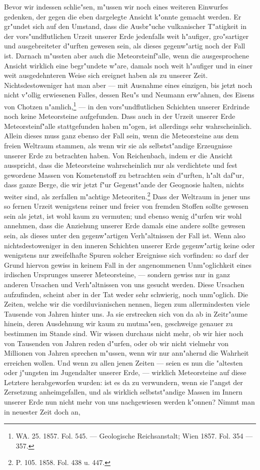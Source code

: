 \documentclass[a4paper, 8pt, oneside, polutonikogreek, german]{article}
\begin{document}
Bevor wir indessen schlie"sen, m"ussen wir noch eines weiteren Einwurfes gedenken, der gegen die eben dargelegte Ansicht k"onnte gemacht werden. Er gr"undet sich auf den Umstand, dass die Ausbr"uche vulkanischer T"atigkeit in der vors"undflutlichen Urzeit unserer Erde jedenfalls weit h"aufiger, gro"sartiger und ausgebreiteter d"urften gewesen sein, als dieses gegenw"artig noch der Fall ist. Darnach m"ussten aber auch die Meteorsteinf"alle, wenn die ausgesprochene Ansicht wirklich eine begr"undete w"are, damals noch weit h"aufiger und in einer weit ausgedehnteren Weise sich ereignet haben als zu unserer Zeit. Nichtsdestoweniger hat man aber --- mit Ausnahme eines einzigen, bis jetzt noch nicht v"ollig erwiesenen Falles, dessen Reu"s und Neumann erw"ahnen, des Eisens von Chotzen n"amlich,\footnote{WA. 25. 1857. Fol. 545. --- Geologische Reichsanstalt; Wien 1857. Fol. 354 --- 357.} --- in den vors"undflutlichen Schichten unserer Erdrinde noch keine Meteorsteine aufgefunden. Dass auch in der Urzeit unserer Erde Meteorsteinf"alle stattgefunden haben m"ogen, ist allerdings sehr wahrscheinlich. Allein dieses muss ganz ebenso der Fall sein, wenn die Meteorsteine aus dem freien Weltraum stammen, als wenn wir sie als selbstst"andige Erzeugnisse unserer Erde zu betrachten haben. Von Reichenbach, indem er die Ansicht ausspricht, dass die Meteorsteine wahrscheinlich nur als verdichtete und fest gewordene Massen von Kometenstoff zu betrachten sein d"urften, h"alt daf"ur, dass ganze Berge, die wir jetzt f"ur Gegenst"ande der Geognosie halten, nichts weiter sind, als zerfallen m"achtige Meteoriten.\footnote{P. 105. 1858. Fol. 438 u. 447.} Dass der Weltraum in jener uns so fernen Urzeit wenigstens reiner und freier von fremden Stoffen sollte gewesen sein als jetzt, ist wohl kaum zu vermuten; und ebenso wenig d"urfen wir wohl annehmen, dass die Anziehung unserer Erde damals eine andere sollte gewesen sein, als dieses unter den gegenw"artigen Verh"altnissen der Fall ist. Wenn also nichtsdestoweniger in den inneren Schichten unserer Erde gegenw"artig keine oder wenigstens nur zweifelhafte Spuren solcher Ereignisse sich vorfinden: so darf der Grund hiervon gewiss in keinem Fall in der angenommenen Unm"oglichkeit eines irdischen Ursprunges unserer Meteorsteine, --- sondern gewiss nur in ganz anderen Ursachen und Verh"altnissen von uns gesucht werden. Diese Ursachen aufzufinden, scheint aber in der Tat weder sehr schwierig, noch unm"oglich. Die Zeiten, welche wir die vordiluvianischen nennen, liegen zum allermindesten viele Tausende von Jahren hinter uns. Ja sie erstrecken sich von da ab in Zeitr"aume hinein, deren Ausdehnung wir kaum zu mutma"sen, geschweige genauer zu bestimmen im Stande sind. Wir wissen durchaus nicht mehr, ob wir hier noch von Tausenden von Jahren reden d"urfen, oder ob wir nicht vielmehr von Millionen von Jahren sprechen m"ussen, wenn wir nur ann"ahernd die Wahrheit erreichen wollen. Und wenn zu allen jenen Zeiten --- seien es nun die "altesten oder j"ungsten im Jugendalter unserer Erde, --- wirklich Meteorsteine auf diese Letztere herabgeworfen wurden: ist es da zu verwundern, wenn sie l"angst der Zersetzung anheimgefallen, und als wirklich selbstst"andige Massen im Innern unserer Erde nun nicht mehr von uns nachgewiesen werden k"onnen? Nimmt man in neuester Zeit doch an, 
\end{document}
